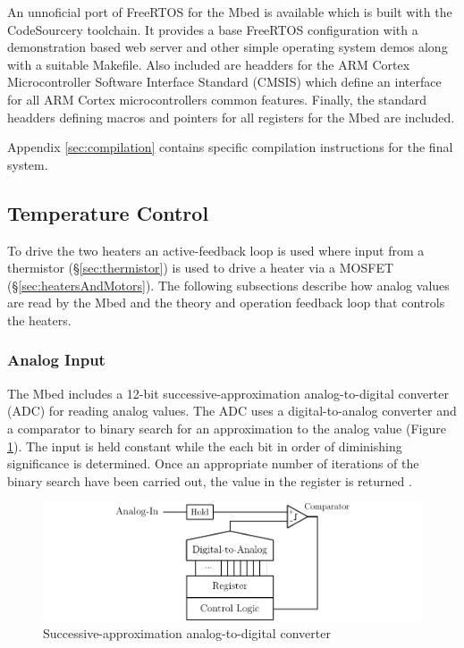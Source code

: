 			
			An unnoficial port of FreeRTOS for the Mbed is available which is built with
			the CodeSourcery toolchain. It provides a base FreeRTOS configuration with a
			demonstration \uIP{} based web server and other simple operating system
			demos along with a suitable Makefile. Also included are headders for the ARM
			Cortex Microcontroller Software Interface Standard (CMSIS) which define an
			interface for all ARM Cortex microcontrollers common features. Finally, the
			standard headders defining macros and pointers for all registers for the
			Mbed are included.
			
			Appendix \ref{sec:compilation} contains specific compilation instructions
			for the final system.
		
		\subsection{Temperature Control}
			
			To drive the two heaters an active-feedback loop is used where input from
			a thermistor (\S \ref{sec:thermistor}) is used to drive a heater via a
			MOSFET (\S \ref{sec:heatersAndMotors}). The following subsections describe
			how analog values are read by the Mbed and the theory and operation
			feedback loop that controls the heaters.
			
			\subsubsection{Analog Input}
				
				The Mbed includes a 12-bit successive-approximation analog-to-digital
				converter (ADC) for reading analog values\cite{lpc1768}. The ADC uses a
				digital-to-analog converter and a comparator to binary search for an
				approximation to the analog value (Figure \ref{fig:adc}). The input is
				held constant while the each bit in order of diminishing significance is
				determined. Once an appropriate number of iterations of the binary
				search have been carried out, the value in the register is returned
				\cite{maximadc}.
				
				\begin{figure}
					\includegraphics[width=1\textwidth]{diagrams/adc.pdf}
					\caption{Successive-approximation analog-to-digital converter}
					\label{fig:adc}
				\end{figure}
				
